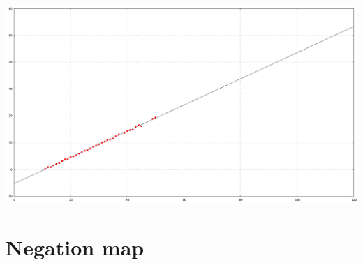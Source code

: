 \documentclass[a4paper,10pt]{report}
\begin{document}
\begin{center}
 \includegraphics[width = 15cm]{regresion_rho_normal_bon.png}
\end{center}


% 
% 
% 
% 
% 
% 
% 
% 
% 
% 
% 
% 
% 
% 
% 

\chapter{Negation map}
\end{document}
